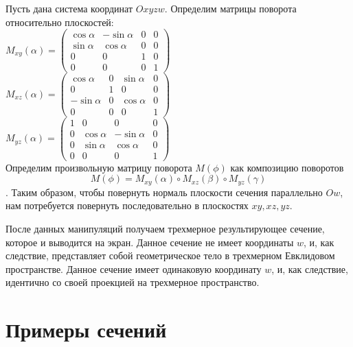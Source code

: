 \documentclass[12pt, a4paper, twoside]{report}
\begin{document}
Пусть дана система координат $Oxyzw$. Определим матрицы поворота относительно плоскостей:
\\

$
M_{xy}(\alpha)=
\begin{equation}
	\left(
		\begin{array}{cccc}
		\cos \alpha & -\sin \alpha & 0 & 0 \\
		\sin \alpha & \cos \alpha & 0 & 0 \\
		0 & 0 & 1 & 0 \\
		0 & 0 & 0 & 1
	\end{array}\right)
\end{equation}
$
\\ 

$
M_{xz}(\alpha)=
\begin{equation}
	\left(
		\begin{array}{cccc}
		\cos \alpha & 0 & \sin \alpha & 0 \\
		0 & 1 & 0 & 0 \\
		-\sin \alpha & 0 & \cos \alpha & 0 \\
		0 & 0 & 0 & 1
	\end{array}\right)
\end{equation}
$
\\

$
M_{yz}(\alpha)=
\begin{equation}
	\left(
		\begin{array}{cccc}
		1 & 0 & 0 & 0 \\
		0 & \cos \alpha & -\sin \alpha & 0 \\
		0 & \sin \alpha & \cos \alpha & 0 \\
		0 & 0 & 0 & 1
	\end{array}\right)
\end{equation}
$
\\

Определим произвольную матрицу поворота $M(\phi)$ как композицию поворотов $$M(\phi)=M_{xy}(\alpha)\circ M_{xz}(\beta)\circ M_{yz}(\gamma)$$.
Таким образом, чтобы повернуть нормаль плоскости сечения параллельно $Ow$, нам потребуется повернуть последовательно в плоскостях $xy, xz, yz$.

После данных манипуляций получаем трехмерное результирующее сечение, которое и выводится на экран. Данное сечение не имеет координаты $w$, и, как следствие, представляет собой геометрическое тело в трехмерном Евклидовом пространстве.
Данное сечение имеет одинаковую координату $w$, и, как следствие, идентично со своей проекцией на трехмерное пространство.
\section{Примеры сечений}
\end{document}
